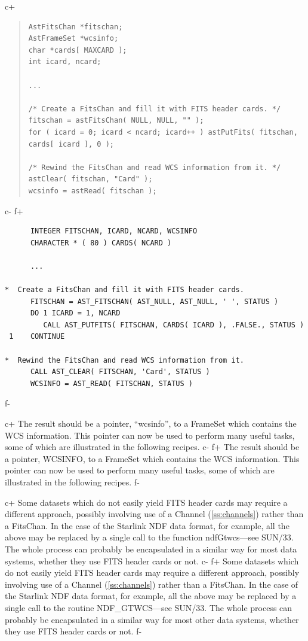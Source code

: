 \documentclass[twoside,11pt]{article}
\newcommand{\xref}[3]{#1}
\newcommand{\secref}[1]{\S\ref{#1}}
\renewcommand{\secref}[1]{\ref{#1}}
\begin{document}
c+
\begin{quote}
\small
\begin{verbatim}
AstFitsChan *fitschan;
AstFrameSet *wcsinfo;
char *cards[ MAXCARD ];
int icard, ncard;

...

/* Create a FitsChan and fill it with FITS header cards. */
fitschan = astFitsChan( NULL, NULL, "" );
for ( icard = 0; icard < ncard; icard++ ) astPutFits( fitschan, cards[ icard ], 0 );

/* Rewind the FitsChan and read WCS information from it. */
astClear( fitschan, "Card" );
wcsinfo = astRead( fitschan );
\end{verbatim}
\normalsize
\end{quote}
c-
f+
\small
\begin{verbatim}
      INTEGER FITSCHAN, ICARD, NCARD, WCSINFO
      CHARACTER * ( 80 ) CARDS( NCARD )

      ...

*  Create a FitsChan and fill it with FITS header cards.
      FITSCHAN = AST_FITSCHAN( AST_NULL, AST_NULL, ' ', STATUS )
      DO 1 ICARD = 1, NCARD
         CALL AST_PUTFITS( FITSCHAN, CARDS( ICARD ), .FALSE., STATUS )
 1    CONTINUE

*  Rewind the FitsChan and read WCS information from it.
      CALL AST_CLEAR( FITSCHAN, 'Card', STATUS )
      WCSINFO = AST_READ( FITSCHAN, STATUS )
\end{verbatim}
\normalsize
f-

c+
The result should be a pointer, ``wcsinfo'', to a FrameSet which
contains the WCS information. This pointer can now be used to perform
many useful tasks, some of which are illustrated in the following
recipes.
c-
f+
The result should be a pointer, WCSINFO, to a FrameSet which contains
the WCS information. This pointer can now be used to perform many
useful tasks, some of which are illustrated in the following recipes.
f-

c+
Some datasets which do not easily yield FITS header cards may require
a different approach, possibly involving use of a Channel
(\secref{ss:channels}) rather than a FitsChan. In the case of the
Starlink NDF data format, for example, all the above may be replaced
by a single call to the function
\xref{ndfGtwcs}{sun33}{ndfGtwcs}---see \xref{SUN/33}{sun33}{}.  The
whole process can probably be encapsulated in a similar way for
most data systems, whether they use FITS header cards or not.
c-
f+
Some datasets which do not easily yield FITS header cards may require
a different approach, possibly involving use of a Channel
(\secref{ss:channels}) rather than a FitsChan. In the case of the
Starlink NDF data format, for example, all the above may be replaced
by a single call to the routine
\xref{NDF\_GTWCS}{sun33}{NDF_GTWCS}---see \xref{SUN/33}{sun33}{}.  The
whole process can probably be encapsulated in a similar way for most
other data systems, whether they use FITS header cards or not.
f-
\end{document}
